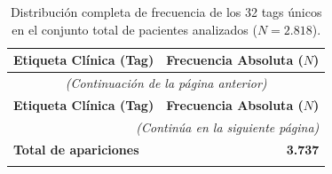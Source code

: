 \documentclass[../main.tex]{subfiles}
\begin{document}
\begin{longtable}{lr}
\hline
\textbf{Etiqueta Clínica (Tag)} & \textbf{Frecuencia Absoluta ($N$)} \\ \hline
\endfirsthead

\multicolumn{2}{c}{\textit{(Continuación de la página anterior)}} \\ \hline
\textbf{Etiqueta Clínica (Tag)} & \textbf{Frecuencia Absoluta ($N$)} \\ \hline
\endhead

\hline \multicolumn{2}{r}{\textit{(Continúa en la siguiente página)}} \\
\endfoot

\hline
\textbf{Total de apariciones} & \textbf{3.737} \\ \hline
\caption{Distribución completa de frecuencia de los 32 tags únicos en el conjunto total de pacientes analizados ($N = 2.818$).}
\label{tab:apendice_tags_completos} 
\endlastfoot


\end{longtable}
\end{document}
